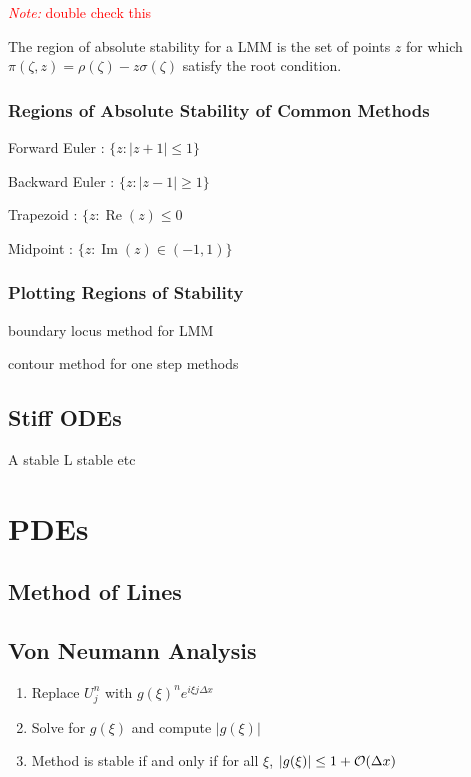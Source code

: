 \documentclass[12pt]{article}
\newcommand{\note}[1]{\textcolor{red}{\textit{Note:} #1}}
\begin{document}
\note{double check this}

The region of absolute stability for a LMM is the set of points \( z \) for which \( \pi(\zeta,z) = \rho(\zeta) - z \sigma(\zeta) \) satisfy the root condition.


\subsubsection{Regions of Absolute Stability of Common Methods}

Forward Euler : \( \{z : |z+1|\leq 1 \} \)

Backward Euler : \( \{ z : |z-1| \geq 1 \} \)

Trapezoid : \( \{ z : \operatorname{Re}(z) \leq 0 \)

Midpoint : \( \{ z : \operatorname{Im}(z) \in (-1,1) \} \)


\subsubsection{Plotting Regions of Stability}

boundary locus method for LMM

contour method for one step methods

\subsection{Stiff ODEs}

A stable L stable etc

\section{PDEs}
\subsection{Method of Lines}

\subsection{Von Neumann Analysis}

\begin{enumerate}[nolistsep]
    \item Replace \( U_j^n \) with \( g(\xi)^n e^{i\xi j \Delta x} \)
    \item Solve for \( g(\xi) \) and compute \( |g(\xi)| \)
    \item Method is stable if and only if for all \( \xi \), \( |g(\xi)| \leq 1+\mathcal{O}(\Delta x) \)
\end{enumerate}
\end{document}
